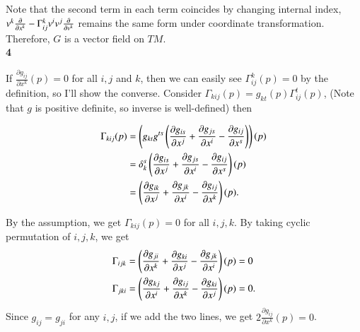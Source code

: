 \documentclass[a4paper, 12pt]{article}
\theoremstyle{Mydefinition}
\theoremstyle{Mytheorem}
\begin{document}
Note that the second term in each term coincides by changing internal index, $v^k\pdv{x^k} - \Gamma_{ij}^k v^i v^j\pdv{v^k}$ remains the same form under coordinate transformation. Therefore, $G$ is a vector field on $TM$.\\

\noindent \textbf{4}

If $\frac{\partial g_{ij}}{\partial x^k}(p) = 0$ for all $i,j$ and $k$, then we can easily see $\Gamma_{ij}^k(p) = 0$ by the definition, so I'll show the converse. Consider $\Gamma_{kij}(p) = g_{kt}(p)\Gamma^t_{ij}(p)$, (Note that $g$ is positive definite, so inverse is well-defined) then 

\begin{equation*}
\begin{split}
    \Gamma_{kij}(p) &= \left(g_{kt}g^{ts}\left(\pdv{g_{is}}{x^j}+\pdv{g_{js}}{x^i} - \pdv{g_{ij}}{x^s}\right)\right)(p)\\
    &=\delta_k^s\left(\pdv{g_{is}}{x^j}+\pdv{g_{js}}{x^i} - \pdv{g_{ij}}{x^s}\right)(p)\\
    &=\left(\pdv{g_{ik}}{x^j}+\pdv{g_{jk}}{x^i} - \pdv{g_{ij}}{x^k}\right)(p).
\end{split}    
\end{equation*}

By the assumption, we get $\Gamma_{kij}(p) = 0$ for all $i,j,k$. By taking cyclic permutation of $i,j,k$, we get
\begin{equation*}
    \begin{split}
        \Gamma_{ijk} = \left(\pdv{g_{ji}}{x^k}+\pdv{g_{ki}}{x^j} - \pdv{g_{jk}}{x^i}\right)(p) &= 0\\
        \Gamma_{jki} = \left(\pdv{g_{kj}}{x^i}+\pdv{g_{ij}}{x^k} - \pdv{g_{ki}}{x^j}\right)(p) &= 0.
    \end{split}
\end{equation*}
Since $g_{ij} = g_{ji}$ for any $i,j$, if we add the two lines, we get $2\frac{\partial g_{ij}}{\partial x^k}(p) = 0$.
\end{document}
